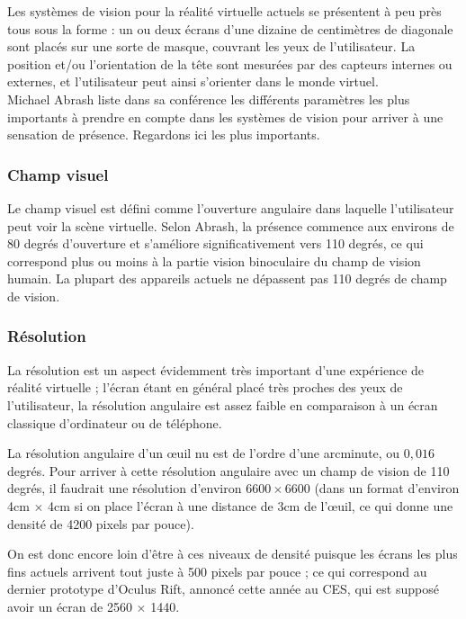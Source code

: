 \documentclass[a4,12pt]{scrartcl}
\begin{document}
Les systèmes de vision pour la réalité virtuelle actuels se présentent à peu près tous sous la forme : un ou deux écrans d’une dizaine de centimètres de diagonale sont placés sur une sorte de masque, couvrant les yeux de l’utilisateur. La position et/ou l’orientation de la tête sont mesurées par des capteurs internes ou externes, et l’utilisateur peut ainsi s’orienter dans le monde virtuel.\\

Michael Abrash liste dans sa conférence \cite{Abrash14} les différents paramètres les plus importants à prendre en compte dans les systèmes de vision pour arriver à une sensation de présence. Regardons ici les plus importants.

\subsubsection{Champ visuel}

Le champ visuel est défini comme l'ouverture angulaire dans laquelle l'utilisateur peut voir la scène virtuelle. Selon Abrash, la présence commence aux environs de 80 degrés d'ouverture et s'améliore significativement vers 110 degrés, ce qui correspond plus ou moins à la partie vision binoculaire du champ de vision humain. La plupart des appareils actuels ne dépassent pas 110 degrés de champ de vision.

\subsubsection{Résolution}

La résolution est un aspect évidemment très important d'une expérience de réalité virtuelle ; l'écran étant en général placé très proches des yeux de l'utilisateur, la résolution angulaire est assez faible en comparaison à un écran classique d'ordinateur ou de téléphone.

La résolution angulaire d'un \oe{}uil nu est de l'ordre d'une arcminute, ou $0,016$ degrés. Pour arriver à cette résolution angulaire avec un champ de vision de 110 degrés, il faudrait une résolution d'environ $6600 \times 6600$ (dans un format d'environ 4cm $\times$ 4cm si on place l'écran à une distance de 3cm de l'\oe{}uil, ce qui donne une densité de 4200 pixels par pouce).

On est donc encore loin d'être à ces niveaux de densité puisque les écrans les plus fins actuels arrivent tout juste à 500 pixels par pouce ; ce qui correspond au dernier prototype d'Oculus Rift, annoncé cette année au CES, qui est supposé avoir un écran de 2560 $\times$ 1440.
\end{document}
